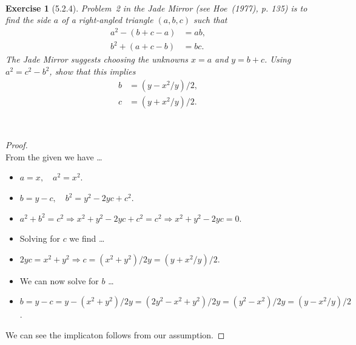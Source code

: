 \documentclass[12pt]{article}
\newcommand{\XB}{\color{black}}
\newcommand{\XBB}{\color{blue}}
\newcommand{\ds}{\displaystyle}
\theoremstyle{plain}
\newtheorem{ex}{Exercise}
\begin{document}
\XBB\hrulefill\XB \\
\begin{ex} [5.2.4]
  Problem~2 in the Jade Mirror (see Hoe~(1977), p. 135) is to find the side $ a $ of a right-angled triangle $ (a, b, c) $ such that
  \begin{align*}
    a^{2} - (b + c - a) &= ab, \\
    b^{2} + (a + c - b) &= bc.
  \end{align*}
  \centering The \emph{Jade Mirror} suggests choosing the unknowns $ x = a $ and $ y = b + c $. Using $ a^{2} = c^{2} - b^{2} $, show that this implies
  \begin{align*}
    b &= (y - x^{2} / y) / 2, \\
    c &= (y + x^{2} / y) / 2.
  \end{align*}
\end{ex}
\XBB\hrulefill\XB \\

\begin{proof}
  \ \\

  From the given we have \dots

  \begin{itemize}
    \item $ \ds a = x, \quad a^{2} = x^{2} $.
    \item $ \ds b = y - c, \quad b^{2} = y^{2} - 2yc + c^{2} $.
    \item $ \ds a^{2} + b^{2} = c^{2} \Rightarrow x^{2} + y^{2} - 2yc + c^{2} = c^{2} \Rightarrow x^{2} + y^{2} - 2yc = 0 $.
    \item Solving for $ c $ we find \dots
    \item $ \ds 2yc = x^{2} + y^{2} \Rightarrow c = (x^{2} + y^{2}) / 2y = (y + x^{2} / y) / 2 $.
    \item We can now solve for $ b $ \dots
    \item $ \ds b = y - c = y - (x^{2} + y^{2}) / 2y = (2y^{2} - x^{2} + y^{2}) / 2y = (y^{2} - x^{2}) / 2y = (y - x^{2} / y) / 2 $.
  \end{itemize}

  We can see the implicaton follows from our assumption.

\end{proof}

\newpage
\end{document}
